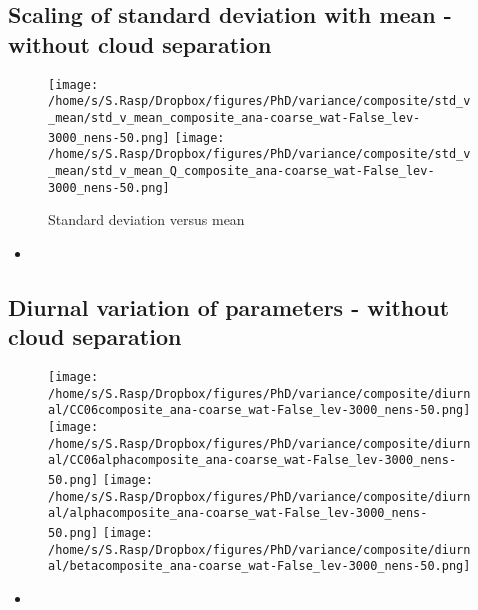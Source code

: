 \documentclass[a4paper, 12pt]{article}
\begin{document}
\subsection{Scaling of standard deviation with mean - without cloud separation}
\begin{figure}[h!]
\noindent \centering
\texttt{[image: /home/s/S.Rasp/Dropbox/figures/PhD/variance/composite/std\_v\_mean/std\_v\_mean\_composite\_ana-coarse\_wat-False\_lev-3000\_nens-50.png]}
\texttt{[image: /home/s/S.Rasp/Dropbox/figures/PhD/variance/composite/std\_v\_mean/std\_v\_mean\_Q\_composite\_ana-coarse\_wat-False\_lev-3000\_nens-50.png]}\\
\caption{Standard deviation versus mean} \label{fig:geographical}
\end{figure}
\begin{itemize}
 \item 
\end{itemize}

\newpage

\subsection{Diurnal variation of parameters - without cloud separation}
\begin{figure}[h!]
\noindent \centering
\texttt{[image: /home/s/S.Rasp/Dropbox/figures/PhD/variance/composite/diurnal/CC06composite\_ana-coarse\_wat-False\_lev-3000\_nens-50.png]}
\texttt{[image: /home/s/S.Rasp/Dropbox/figures/PhD/variance/composite/diurnal/CC06alphacomposite\_ana-coarse\_wat-False\_lev-3000\_nens-50.png]}
\texttt{[image: /home/s/S.Rasp/Dropbox/figures/PhD/variance/composite/diurnal/alphacomposite\_ana-coarse\_wat-False\_lev-3000\_nens-50.png]}
\texttt{[image: /home/s/S.Rasp/Dropbox/figures/PhD/variance/composite/diurnal/betacomposite\_ana-coarse\_wat-False\_lev-3000\_nens-50.png]}\\
\caption{} \label{fig:geographical}
\end{figure}
\begin{itemize}
 \item 
\end{itemize}

\newpage
\end{document}
